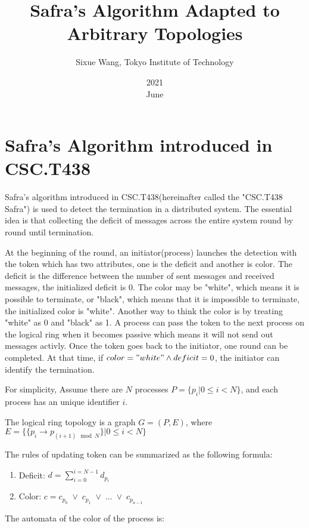 \documentclass{article}
\title{Safra's Algorithm Adapted to Arbitrary Topologies}
\date{2021\\ June}
\author{Sixue Wang, Tokyo Institute of Technology}
\begin{document}
\maketitle

\section{Safra's Algorithm introduced in CSC.T438\cite[][]{safra}}
Safra's algorithm introduced in CSC.T438(hereinafter called the "CSC.T438 Safra") is used to detect the termination in a distributed system.
The essential idea is that collecting the deficit of messages across the entire system round by round until termination.

At the beginning of the round, an initiator(process) launches the detection with the token which has two attributes, one is the deficit and another is color.
The deficit is the difference between the number of sent messages and received messages, the initialized deficit is 0.
The color may be "white", which means it is possible to terminate, or "black", which means that it is impossible to terminate, the initialized color is "white".
Another way to think the color is by treating "white" as 0 and "black" as 1.
A process can pass the token to the next process on the logical ring when it becomes passive which means it will not send out messages activly.
Once the token goes back to the initiator, one round can be completed.
At that time, if $color = "white" \land deficit = 0$, the initiator can identify the termination.

For simplicity, Assume there are $N$ processes $P = \{p_i | 0 \leq i < N\}$, and each process has an unique identifier $i$.

The logical ring topology is a graph $G = (P, E)$, where $E = \{ \{p_{i} \rightarrow p_{(i+1) \mod N}\} | 0 \leq i < N\}$

The rules of updating token can be summarized as the following formula:
\begin{enumerate}
  \centering
  \item Deficit: $d = \sum_{i=0}^{i=N-1} d_{p_i}$
  \item Color: $c = c_{p_0} \; \lor \; c_{p_1} \; \lor \; ... \; \lor \; c_{p_{n-1}}$
\end{enumerate}

The automata of the color of the process is:
\begin{figure}[hbt!]
  \centering
\end{figure}
\end{document}
